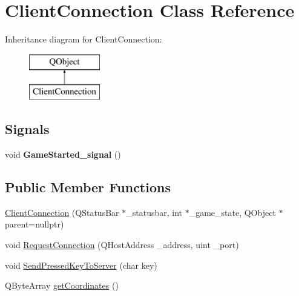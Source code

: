 \hypertarget{class_client_connection}{}\section{Client\+Connection Class Reference}
\label{class_client_connection}
Inheritance diagram for Client\+Connection\+:\begin{figure}[H]
\begin{center}
\leavevmode
\includegraphics[height=2.000000cm]{class_client_connection}
\end{center}
\end{figure}
\subsection*{Signals}
\begin{DoxyCompactItemize}
\item 
\mbox{\label{class_client_connection_a36ede8a48237a964e028c580df771256}} 
void {\bfseries Game\+Started\+\_\+signal} ()
\end{DoxyCompactItemize}
\subsection*{Public Member Functions}
\begin{DoxyCompactItemize}
\item 
\mbox{\hyperlink{class_client_connection_af7853013395a43befeab1f44b0af863f}{Client\+Connection}} (Q\+Status\+Bar $\ast$\+\_\+statusbar, int $\ast$\+\_\+game\+\_\+state, Q\+Object $\ast$parent=nullptr)
\item 
void \mbox{\hyperlink{class_client_connection_a12d5696ee4d4987e1926d1f8e6626af0}{Request\+Connection}} (Q\+Host\+Address \+\_\+address, uint \+\_\+port)
\item 
void \mbox{\hyperlink{class_client_connection_a2b0ac3043269fc55e415df2c05b880c1}{Send\+Pressed\+Key\+To\+Server}} (char key)
\item 
Q\+Byte\+Array \mbox{\hyperlink{class_client_connection_a24fb529ef10c41be5239afe1928df87e}{get\+Coordinates}} ()
\end{DoxyCompactItemize}


